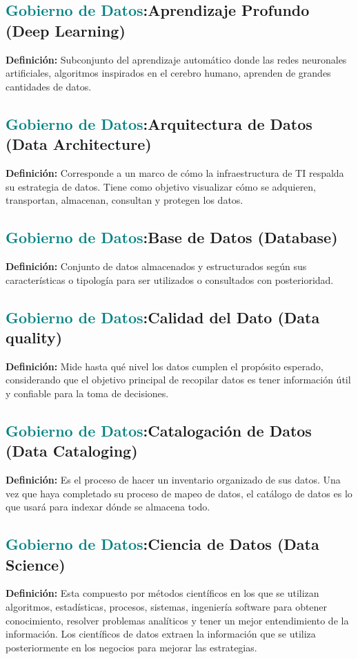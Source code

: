 \documentclass[12pt]{article}
\begin{document}
\subsection{\textcolor{teal}{Gobierno de Datos}:{Aprendizaje Profundo (Deep Learning)}}
\textbf{Definición:} Subconjunto del aprendizaje automático donde las redes neuronales artificiales, algoritmos inspirados en el cerebro humano, aprenden de grandes cantidades de datos.
\subsection{\textcolor{teal}{Gobierno de Datos}:{Arquitectura de Datos (Data Architecture)}}
\textbf{Definición:} Corresponde a un marco de cómo la infraestructura de TI respalda su estrategia de datos. Tiene como objetivo visualizar cómo se adquieren, transportan, almacenan, consultan y protegen los datos.
\subsection{\textcolor{teal}{Gobierno de Datos}:{Base de Datos (Database)}}
\textbf{Definición:} Conjunto de datos almacenados y estructurados según sus características o tipología para ser utilizados o consultados con posterioridad.
\subsection{\textcolor{teal}{Gobierno de Datos}:{Calidad del Dato (Data quality)}}
\textbf{Definición:} Mide hasta qué nivel los datos cumplen el propósito esperado, considerando que el objetivo principal de recopilar datos es tener información útil y confiable para la toma de decisiones.
\subsection{\textcolor{teal}{Gobierno de Datos}:{Catalogación de Datos (Data Cataloging)}}
\textbf{Definición:} Es el proceso de hacer un inventario organizado de sus datos. Una vez que haya completado su proceso de mapeo de datos, el catálogo de datos es lo que usará para indexar dónde se almacena todo.
\subsection{\textcolor{teal}{Gobierno de Datos}:{Ciencia de Datos (Data Science)}}
\textbf{Definición:} Esta compuesto por métodos científicos en los que se utilizan algoritmos, estadísticas, procesos, sistemas, ingeniería software para obtener conocimiento, resolver problemas analíticos y tener un mejor entendimiento de la información. Los científicos de datos extraen la información que se utiliza posteriormente en los negocios para mejorar las estrategias.
\end{document}
